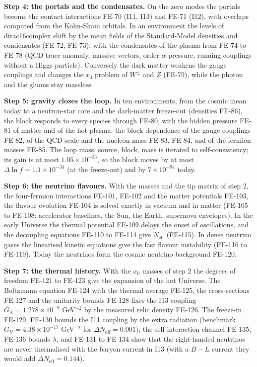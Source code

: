 \documentclass[
  10pt,
]{article}
\begin{document}
\textbf{Step 4: the portals and the condensates.} On the zero modes the
portals become the contact interactions FE-70 (I11, I13) and FE-71
(I12), with overlaps computed from the Kohn-Sham orbitals. In an
environment the levels of dirac16complex shift by the mean fields of the
Standard-Model densities and condensates (FE-72, FE-73), with the
condensates of the plasma from FE-74 to FE-78 (QCD trace anomaly,
massive vectors, order-\(\alpha\) pressure, running couplings without a
Higgs particle). Conversely the dark matter weakens the gauge couplings
and changes the \(x_0\) problem of \(W^\pm\) and \(Z\) (FE-79), while
the photon and the gluons stay massless.

\textbf{Step 5: gravity closes the loop.} In ten environments, from the
cosmic mean today to a neutron-star core and the dark-matter freeze-out
(densities FE-86), the block responds to every species through FE-80,
with the hidden pressure FE-81 of matter and of the hot plasma, the
block dependence of the gauge couplings FE-82, of the QCD scale and the
nucleon mass FE-83, FE-84, and of the fermion masses FE-85. The loop
mass, source, block, mass is iterated to self-consistency; its gain is
at most \(1.05\times10^{-33}\), so the block moves by at most
\(\Delta\ln f = 1.1\times10^{-34}\) (at the freeze-out) and by
\(7\times10^{-94}\) today.

\textbf{Step 6: the neutrino flavours.} With the masses and the tip
matrix of step 2, the four-fermion interactions FE-101, FE-102 and the
matter potentials FE-103, the flavour evolution FE-104 is solved exactly
in vacuum and in matter (FE-105 to FE-108: accelerator baselines, the
Sun, the Earth, supernova envelopes). In the early Universe the thermal
potential FE-109 delays the onset of oscillations, and the decoupling
equations FE-110 to FE-114 give \(N_{\mathrm{eff}}\) (FE-115). In dense
neutrino gases the linearised kinetic equations give the fast flavour
instability (FE-116 to FE-119). Today the neutrinos form the cosmic
neutrino background FE-120.

\textbf{Step 7: the thermal history.} With the \(x_0\) masses of step 2
the degrees of freedom FE-121 to FE-123 give the expansion of the hot
Universe. The Boltzmann equation FE-124 with the thermal average FE-125,
the cross-sections FE-127 and the unitarity bounds FE-128 fixes the I13
coupling \(G_{\mathrm{A}} = 1.278\times10^{-9}\) GeV\(^{-2}\) by the
measured relic density FE-126. The freeze-in FE-129, FE-130 bounds the
I11 coupling by the extra radiation (benchmark
\(G_{\mathrm{V}} = 4.38\times10^{-17}\) GeV\(^{-2}\) for
\(\Delta N_{\mathrm{eff}} = 0.001\)), the self-interaction channel
FE-135, FE-136 bounds \(\lambda\), and FE-131 to FE-134 show that the
right-handed neutrinos are never thermalised with the baryon current in
I13 (with a \(B - L\) current they would add
\(\Delta N_{\mathrm{eff}} = 0.144\)).
\end{document}
